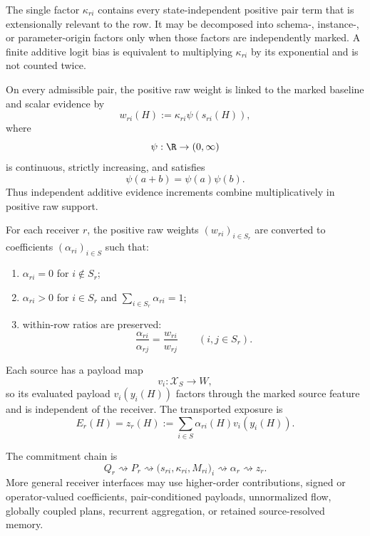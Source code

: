 The single factor $\kappa_{ri}$ contains every state-independent positive pair term that is extensionally relevant to the row. It may be decomposed into schema-, instance-, or parameter-origin factors only when those factors are independently marked. A finite additive logit bias is equivalent to multiplying $\kappa_{ri}$ by its exponential and is not counted twice.

\begin{assumption}\label{ass:link}
On every admissible pair, the positive raw weight is linked to the marked baseline and scalar evidence by
\[
w_{ri}(H):=\kappa_{ri}\psi\!\left(s_{ri}(H)\right),
\]
where
\[
\psi:\R\to(0,\infty)
\]
is continuous, strictly increasing, and satisfies
\[
\psi(a+b)=\psi(a)\psi(b).
\]
Thus independent additive evidence increments combine multiplicatively in positive raw support.
\end{assumption}

\begin{assumption}\label{ass:row-anchor}
For each receiver $r$, the positive raw weights $(w_{ri})_{i\in S_r}$ are converted to coefficients $(\alpha_{ri})_{i\in S}$ such that:
\begin{enumerate}[label=(\roman*)]
\item $\alpha_{ri}=0$ for $i\notin S_r$;
\item $\alpha_{ri}>0$ for $i\in S_r$ and $\sum_{i\in S_r}\alpha_{ri}=1$;
\item within-row ratios are preserved:
\[
\frac{\alpha_{ri}}{\alpha_{rj}}
=
\frac{w_{ri}}{w_{rj}}
\qquad(i,j\in S_r).
\]
\end{enumerate}
\end{assumption}

\begin{assumption}\label{ass:values-aggregation}
Each source has a payload map
\[
v_i:\mathcal X_S\to W,
\]
so its evaluated payload $v_i(y_i(H))$ factors through the marked source feature and is independent of the receiver. The transported exposure is
\[
E_r(H)=z_r(H):=\sum_{i\in S}\alpha_{ri}(H)v_i(y_i(H)).
\]
\end{assumption}

The commitment chain is
\[
\boxed{
Q_r
\rightsquigarrow
P_r
\rightsquigarrow
\bigl(s_{ri},\kappa_{ri},M_{ri}\bigr)_i
\rightsquigarrow
\alpha_r
\rightsquigarrow
z_r.
}
\]
More general receiver interfaces may use higher-order contributions, signed or operator-valued coefficients, pair-conditioned payloads, unnormalized flow, globally coupled plans, recurrent aggregation, or retained source-resolved memory.

